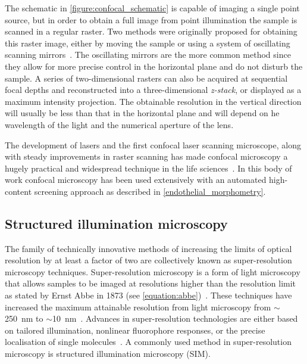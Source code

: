 The schematic in \autoref{figure:confocal_schematic} is capable of imaging a single point source, but in order to obtain a full image from point illumination the sample is scanned in a regular raster. Two methods were originally proposed for obtaining this raster image, either by moving the sample or using a system of oscillating scanning mirrors~\cite{Minsky1988}. The oscillating mirrors are the more common method since they allow for more precise control in the horizontal plane and do not disturb the sample. A series of two-dimensional rasters can also be acquired at sequential focal depths and reconstructed into a three-dimensional \emph{z-stack}, or displayed as a maximum intensity projection. The obtainable resolution in the vertical direction will usually be less than that in the horizontal plane and will depend on he wavelength of the light and the numerical aperture of the lens.

The development of lasers and the first confocal laser scanning microscope,  along with steady improvements in raster scanning has made confocal microscopy a hugely practical and widespread technique in the life sciences~\cite{Sheppard1977}. In this body of work confocal microscopy has been used extensively with an automated high-content screening approach as described in \autoref{endothelial_morphometry}.

\subsection{Structured illumination microscopy}
\label{introduction:microscopy:structured_illumination_microscopy}
The family of technically innovative methods of increasing the limits of optical resolution by at least a factor of two are collectively known as super-resolution microscopy techniques. Super-resolution microscopy is a form of light microscopy that allows samples to be imaged at resolutions higher than the resolution limit as stated by Ernst Abbe in 1873 (see \autoref{equation:abbe})~\cite{Abbe1873}. These techniques have increased the maximum attainable resolution from light microscopy from $\sim$\SI{250}{\nano\meter} to $\sim$\SI{10}{\nano\meter}~\cite{Galbraith2011}. Advances in super-resolution technologies are either based on tailored illumination, nonlinear fluorophore responses, or the precise localisation of single molecules~\cite{Schermelleh2010}. A commonly used method in super-resolution microscopy is structured illumination microscopy (SIM).

